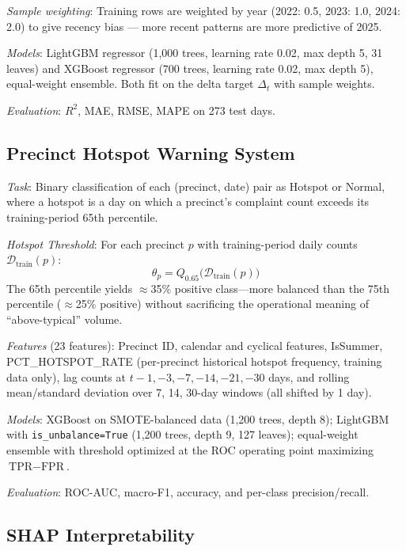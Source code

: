 \documentclass[conference]{IEEEtran}
\begin{document}
\textit{Sample weighting}: Training rows are weighted by year (2022: 0.5, 2023: 1.0, 2024: 2.0) to give recency bias — more recent patterns are more predictive of 2025.

\textit{Models}: LightGBM regressor (1,000 trees, learning rate 0.02, max depth 5, 31 leaves) and XGBoost regressor (700 trees, learning rate 0.02, max depth 5), equal-weight ensemble. Both fit on the delta target $\Delta_t$ with sample weights.

\textit{Evaluation}: $R^2$, MAE, RMSE, MAPE on 273 test days.

\subsection{Precinct Hotspot Warning System}

\textit{Task}: Binary classification of each (precinct, date) pair as Hotspot or Normal, where a hotspot is a day on which a precinct's complaint count exceeds its training-period 65th percentile.

\textit{Hotspot Threshold}: For each precinct $p$ with training-period daily counts $\mathcal{D}_\text{train}(p)$:
\begin{equation}
  \theta_p = Q_{0.65}\bigl(\mathcal{D}_\text{train}(p)\bigr)
\end{equation}
The 65th percentile yields $\approx$35\% positive class—more balanced than the 75th percentile ($\approx$25\% positive) without sacrificing the operational meaning of ``above-typical'' volume.

\textit{Features} (23 features): Precinct ID, calendar and cyclical features, IsSummer, PCT\_HOTSPOT\_RATE (per-precinct historical hotspot frequency, training data only), lag counts at $t-1,-3,-7,-14,-21,-30$ days, and rolling mean/standard deviation over 7, 14, 30-day windows (all shifted by 1 day).

\textit{Models}: XGBoost on SMOTE-balanced data (1,200 trees, depth 8); LightGBM with \texttt{is\_unbalance=True} (1,200 trees, depth 9, 127 leaves); equal-weight ensemble with threshold optimized at the ROC operating point maximizing $\text{TPR} - \text{FPR}$.

\textit{Evaluation}: ROC-AUC, macro-F1, accuracy, and per-class precision/recall.

\subsection{SHAP Interpretability}
\end{document}
